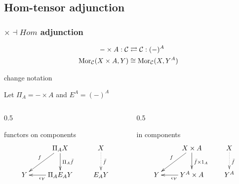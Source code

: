 \subsection{Hom-tensor adjunction}
\begin{frame}[t]
\frametitle{$\times \dashv Hom$ adjunction}
\begin{block}{}
\abovedisplayskip=0pt
\begin{align*}
- \times A: \mathcal{C} & \rightleftarrows \mathcal{C}: (-)^A\\
\mathop{\rm Mor}\nolimits_{\mathcal{C}}(X \times A, Y) & \cong  \mathop{\rm Mor}\nolimits_{\mathcal{C}}(X, Y^A)
\end{align*}
\end{block}
\begin{block}{change notation}
	\begin{center}
	Let $\Pi_A = - \times A$ and $E^A = (-)^A$
	\end{center}
\end{block}
\begin{columns}[t]
    \begin{column}{0.5\framewidth}
		\begin{block}{functors on components}
			$$
			\xymatrix{
			& \Pi_A X \ar[d]^{\Pi_A \bar{f}} \ar[dl]_{f} & X \ar@{.>}[d]^{\bar{f}}\\
			Y & \Pi_A E_A Y \ar[l]^{\epsilon_Y} & E_A Y}
			$$
		\end{block}		
    \end{column}
    \begin{column}{0.5\framewidth}
		\begin{block}{in components}
			$$
			\xymatrix{
			& X \times A \ar[d]^{\bar{f} \times 1_A} \ar[dl]_{f} & X \ar@{.>}[d]^{\bar{f}}\\
			Y & Y^A \times A \ar[l]^{\epsilon_Y} & Y^A}
			$$
		\end{block}
    \end{column}
\end{columns}
\end{frame}

